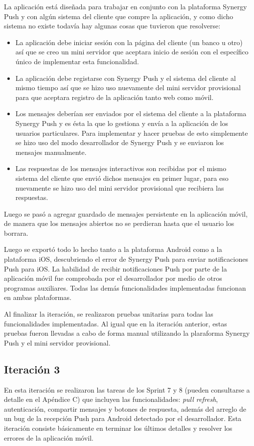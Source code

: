 La aplicación está diseñada para trabajar en conjunto con la plataforma Synergy Push y con algún sistema del cliente que compre la aplicación, y como dicho sistema no existe todavía hay algunas cosas que tuvieron que resolverse:
\smallskip
\begin{itemize}[noitemsep,nolistsep]
  \item La aplicación debe iniciar sesión con la página del cliente (un banco u otro) así que se creo un mini servidor que aceptara inicio de sesión con el específico único de implementar esta funcionalidad.
  \item La aplicación debe registarse con Synergy Push y el sistema del cliente al mismo tiempo así que se hizo uso nuevamente del mini servidor provisional para que aceptara registro de la aplicación tanto web como móvil.
  \item Los mensajes deberían ser enviados por el sistema del cliente a la plataforma Synergy Push y es ésta la que lo gestiona y envía a la aplicación de los usuarios particulares. Para implementar y hacer pruebas de esto simplemente se hizo uso del modo desarrollador de Synergy Push y se enviaron los mensajes manualmente.
  \item Las respuestas de los mensajes interactivos son recibidas por el mismo sistema del cliente que envió dichos mensajes en primer lugar, para eso nuevamente se hizo uso del mini servidor provisional que recibiera las respuestas.
\end{itemize}
\bigskip


Luego se pasó a agregar guardado de mensajes persistente en la aplicación móvil, de manera que los mensajes abiertos no se perdieran hasta que el usuario los borrara.


Luego se exportó todo lo hecho tanto a la plataforma Android como a la plataforma iOS, descubriendo el error de Synergy Push para enviar notificaciones Push para iOS. La habilidad de recibir notificaciones Push por parte de la aplicación móvil fue comprobada por el desarrollador por medio de otros programas auxiliares. Todas las demás funcionalidades implementadas funcionan en ambas plataformas.


Al finalizar la iteración, se realizaron pruebas unitarias para todas las funcionalidades implementadas. Al igual que en la iteración anterior, estas pruebas fueron llevadas a cabo de forma manual utilizando la plaraforma Synergy Push y el mini servidor provisional.


\subsection{Iteración 3}
En esta iteración se realizaron las tareas de los Sprint 7 y 8 (pueden consultarse a detalle en el Apéndice C) que incluyen las funcionalidades: \textit{pull refresh}, autenticación, compartir mensajes y botones de respuesta, además del arreglo de un bug de la recepción Push para Android detectado por el desarrollador. Esta iteración consiste básicamente en terminar los últimos detalles y resolver los errores de la aplicación móvil.


